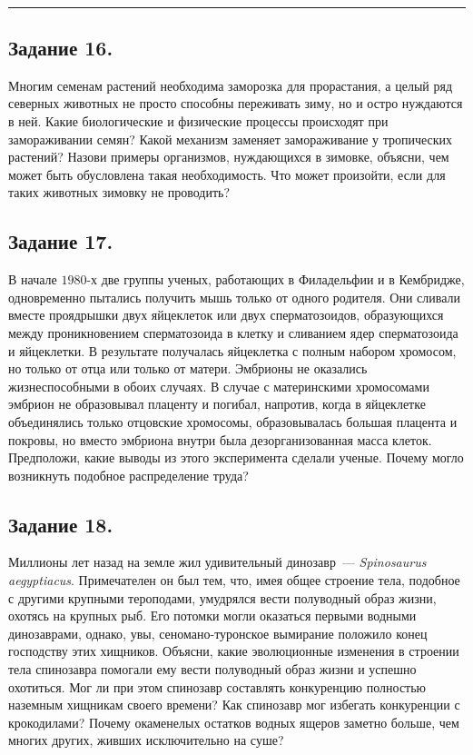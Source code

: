 \\
\rule[0.5\baselineskip]{\textwidth}{1pt}

\vspace{0\baselineskip}

\subsection*{Задание 16.}
Многим семенам растений необходима заморозка для прорастания, а целый ряд северных животных не просто способны переживать зиму, но и остро нуждаются в ней. Какие биологические и физические процессы происходят при замораживании семян? Какой механизм заменяет замораживание у тропических растений? Назови примеры организмов, нуждающихся в зимовке, объясни, чем может быть обусловлена такая необходимость. Что может произойти, если для таких животных зимовку не проводить?

\subsection*{Задание 17.}
В начале $1980$-х две группы ученых, работающих в Филадельфии и в Кембридже, одновременно пытались получить мышь только от одного родителя. Они сливали вместе проядрышки двух яйцеклеток или двух сперматозоидов, образующихся между проникновением сперматозоида в клетку и сливанием ядер сперматозоида и яйцеклетки. В результате получалась яйцеклетка с полным набором хромосом, но только от отца или только от матери. Эмбрионы не оказались жизнеспособными в обоих случаях. В случае с материнскими хромосомами эмбрион не образовывал плаценту и погибал, напротив, когда в яйцеклетке объединялись только отцовские хромосомы, образовывалась большая плацента и покровы, но вместо эмбриона внутри была дезорганизованная масса клеток. Предположи, какие выводы из этого эксперимента сделали ученые. Почему могло возникнуть подобное распределение труда?

\subsection*{Задание 18.}
Миллионы лет назад на земле жил удивительный динозавр~— \textit{Spinosau\-rus aegyptiacus}. Примечателен он был тем, что, имея общее строение тела, подобное с другими крупными
тероподами, умудрялся вести полуводный образ жизни, охотясь на крупных рыб. Его потомки могли оказаться первыми водными динозаврами, однако, увы, сеномано-туронское вымирание положило конец господству этих хищников. Объясни, какие эволюционные изменения в строении тела спинозавра помогали ему вести полуводный
образ жизни и успешно охотиться. Мог ли при этом спинозавр составлять конкуренцию полностью наземным хищникам своего времени? Как спинозавр мог избегать конкуренции с крокодилами? Почему окаменелых остатков водных ящеров заметно больше, чем многих других, живших исключительно на суше?
